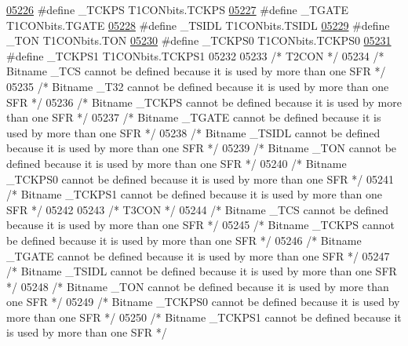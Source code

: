 \begin{DoxyCode}
\hypertarget{a00015_source_l05226}{}\hyperlink{a00015_a40576ef0b8ce130c941a4a1baa53264d}{05226} \textcolor{preprocessor}{#define \_TCKPS T1CONbits.TCKPS}
\hypertarget{a00015_source_l05227}{}\hyperlink{a00015_ab42cc64c55fdca6cb6444d87c26dd6ce}{05227} \textcolor{preprocessor}{#define \_TGATE T1CONbits.TGATE}
\hypertarget{a00015_source_l05228}{}\hyperlink{a00015_aa16ced5b84e8061182a0b5aff865d9bc}{05228} \textcolor{preprocessor}{#define \_TSIDL T1CONbits.TSIDL}
\hypertarget{a00015_source_l05229}{}\hyperlink{a00015_afaf4a32fc181a1178cc7bb90b3c8640f}{05229} \textcolor{preprocessor}{#define \_TON T1CONbits.TON}
\hypertarget{a00015_source_l05230}{}\hyperlink{a00015_a995b8943ae80b8855b86284ac7e1fe79}{05230} \textcolor{preprocessor}{#define \_TCKPS0 T1CONbits.TCKPS0}
\hypertarget{a00015_source_l05231}{}\hyperlink{a00015_ab4c4c1d485360364ec97952c599971a9}{05231} \textcolor{preprocessor}{#define \_TCKPS1 T1CONbits.TCKPS1}
05232 
05233 \textcolor{comment}{/* T2CON */}
05234 \textcolor{comment}{/* Bitname \_TCS cannot be defined because it is used by more than one SFR */}
05235 \textcolor{comment}{/* Bitname \_T32 cannot be defined because it is used by more than one SFR */}
05236 \textcolor{comment}{/* Bitname \_TCKPS cannot be defined because it is used by more than one SFR */}
05237 \textcolor{comment}{/* Bitname \_TGATE cannot be defined because it is used by more than one SFR */}
05238 \textcolor{comment}{/* Bitname \_TSIDL cannot be defined because it is used by more than one SFR */}
05239 \textcolor{comment}{/* Bitname \_TON cannot be defined because it is used by more than one SFR */}
05240 \textcolor{comment}{/* Bitname \_TCKPS0 cannot be defined because it is used by more than one SFR */}
05241 \textcolor{comment}{/* Bitname \_TCKPS1 cannot be defined because it is used by more than one SFR */}
05242 
05243 \textcolor{comment}{/* T3CON */}
05244 \textcolor{comment}{/* Bitname \_TCS cannot be defined because it is used by more than one SFR */}
05245 \textcolor{comment}{/* Bitname \_TCKPS cannot be defined because it is used by more than one SFR */}
05246 \textcolor{comment}{/* Bitname \_TGATE cannot be defined because it is used by more than one SFR */}
05247 \textcolor{comment}{/* Bitname \_TSIDL cannot be defined because it is used by more than one SFR */}
05248 \textcolor{comment}{/* Bitname \_TON cannot be defined because it is used by more than one SFR */}
05249 \textcolor{comment}{/* Bitname \_TCKPS0 cannot be defined because it is used by more than one SFR */}
05250 \textcolor{comment}{/* Bitname \_TCKPS1 cannot be defined because it is used by more than one SFR */}

\end{DoxyCode}
